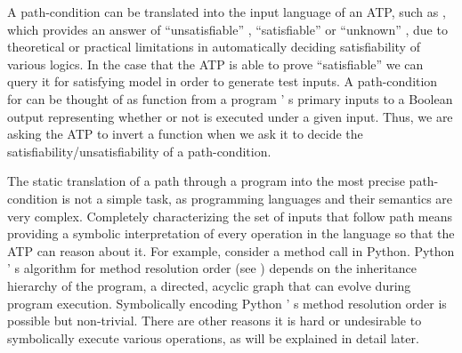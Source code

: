 \documentclass{IOS-Book-Article}
\begin{document}
\begin{mdP}[class={indent},data-line={105}]%
{}A path-condition can be translated into the input
language of an ATP, such as%
{}{\mdNbsp}%
{}%
{}, which provides an answer
of %
{}{\textquotedblleft}unsatisfiable{\textquotedblright}%
{}, %
{}{\textquotedblleft}satisfiable{\textquotedblright}%
{} or %
{}{\textquotedblleft}unknown{\textquotedblright}%
{}, due to theoretical or practical
limitations in automatically deciding satisfiability of various logics.
In the case that the ATP is able to prove %
{}{\textquotedblleft}satisfiable{\textquotedblright}%
{} we can query it for 
satisfying model in order to generate test inputs. A path-condition 
for %
{}%
{} can be thought of as function from a
program%
{}{'}%
{}s primary inputs to a Boolean output representing whether
or not %
{}%
{} is executed under a given input. Thus, we are asking
the ATP to invert a function when we ask it to decide
the satisfiability/unsatisfiability of a path-condition.%
\end{mdP}%
\begin{mdP}[class={indent},data-line={117}]%
{}The static translation of a path %
{}%
{} through a program %
{}%
{} into 
the most precise path-condition %
{}%
{} is not a simple task, as 
programming languages and their semantics are very complex.
Completely characterizing the set of inputs %
{}%
{} that follow
path %
{}%
{} means providing a symbolic interpretation of 
every operation in the language so that the
ATP can reason about it. For example, consider a method call in Python. 
Python%
{}{'}%
{}s algorithm for method resolution order (see%
{}{\mdNbsp}%
{})
depends on the inheritance hierarchy of the program, a directed, 
acyclic graph that can evolve during program execution. Symbolically
encoding Python%
{}{'}%
{}s method resolution order is possible but non-trivial.
There are other reasons it is hard or undesirable to symbolically 
execute various operations, as will be explained in detail later.%
\end{mdP}%
\end{document}
